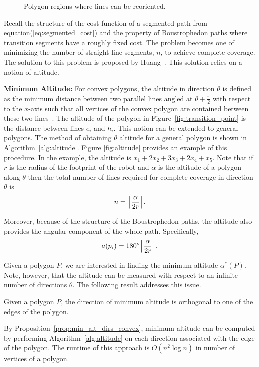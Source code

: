 \documentclass[../main.tex]{subfiles}
\begin{document}
\begin{figure}
	\centering
	\begin{subfigure}{0.5\linewidth}
		\centering
		
	\end{subfigure}%
	\begin{subfigure}{0.5\linewidth}
		\centering
		
	\end{subfigure}
	\caption{Polygon regions where lines can be reoriented.}
	\label{fig:reorder_regions}
\end{figure}

Recall the structure of the cost function of a segmented path from equation(\ref{eq:segmented_cost}) and the property of Boustrophedon paths where transition segments have a roughly fixed cost. The problem becomes one of minimizing the number of straight line segments, $n$, to achieve complete coverage. The solution to this problem is proposed by Huang~\cite{Huang2001optimal}. This solution relies on a notion of altitude.

\textbf{Minimum Altitude:} For convex polygons, the altitude in direction $\theta$ is defined as the minimum distance between two parallel lines angled at $\theta+\frac{\pi}{2}$ with respect to the $x$-axis such that all vertices of the convex polygon are contained between these two lines~\cite{Huang2001optimal}. The altitude of the polygon in Figure~\ref{fig:transition_point} is the distance between lines $e_i$ and $h_i$. This notion can be extended to general polygons. The method of obtaining $\theta$ altitude for a general polygon is shown in Algorithm~\ref{alg:altitude}. Figure \ref{fig:altitude} provides an example of this procedure. In the example, the altitude is $x_1 + 2x_2 + 3x_3 + 2x_4 + x_5$. Note that if $r$ is the radius of the footprint of the robot and $\alpha$ is the altitude of a polygon along $\theta$ then the total number of lines required for complete coverage in direction $\theta$ is
\begin{equation}
	n=\ceil*{\frac{\alpha}{2r}}.
\end{equation}

Moreover, because of the structure of the Boustrophedon paths, the altitude also provides the angular component of the whole path. Specifically, 
\begin{equation}
	a(p_i)=180^o\ceil*{\frac{\alpha}{2r}}.
\end{equation}

Given a polygon $P$, we are interested in finding the minimum altitude $\alpha^*(P)$.  Note, however, that the altitude can be measured with respect to an infinite number of directions $\theta$. The following result addresses this issue.
\begin{proposition}
\label{prop:min_alt_dirs_convex}
Given a polygon $P$, the direction of minimum altitude is orthogonal to one of the edges of the polygon. 
\end{proposition}
By Proposition~\ref{prop:min_alt_dirs_convex}, minimum altitude can be computed by performing Algorithm~\ref{alg:altitude} on each direction associated with the edge of the polygon. The runtime of this approach is $O(n^2\log n)$ in number of vertices of a polygon.
\end{document}
